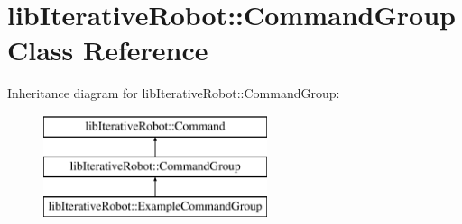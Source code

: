 \hypertarget{classlib_iterative_robot_1_1_command_group}{}\section{lib\+Iterative\+Robot\+::Command\+Group Class Reference}
\label{classlib_iterative_robot_1_1_command_group}
Inheritance diagram for lib\+Iterative\+Robot\+::Command\+Group\+:\begin{figure}[H]
\begin{center}
\leavevmode
\includegraphics[height=3.000000cm]{classlib_iterative_robot_1_1_command_group}
\end{center}
\end{figure}
